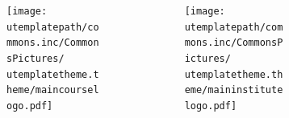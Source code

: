 \institute[\uinstituteshort]{{\uinstitute \\ \uchaire}}


\date[\uversion]{\tiny{Publication \INFODistrib ~du \\ \DTMnow}}



%
%





\begin{frame}[plain]
 					\begin{figure}
  					 \centering
  					 \begin{columns}[c]
  \begin{column}{0.4\textwidth}
  
    \begin{figure}
        \begin{flushleft}
  			\texttt{[image: \\utemplatepath/commons.inc/CommonsPictures/\\utemplatetheme.theme/maincourselogo.pdf]}
  \end{flushleft}
  \end{figure}
      \end{column}
  
  \begin{column}{0.6\textwidth}
    \begin{figure}
        \begin{flushright}
 		    \texttt{[image: \\utemplatepath/commons.inc/CommonsPictures/\\utemplatetheme.theme/maininstitutelogo.pdf]}
    \end{flushright}
  \end{figure}
  \end{column}
\end{columns}
   							  
   							  \end{figure}
							
				  				\titlepage
\end{frame}



